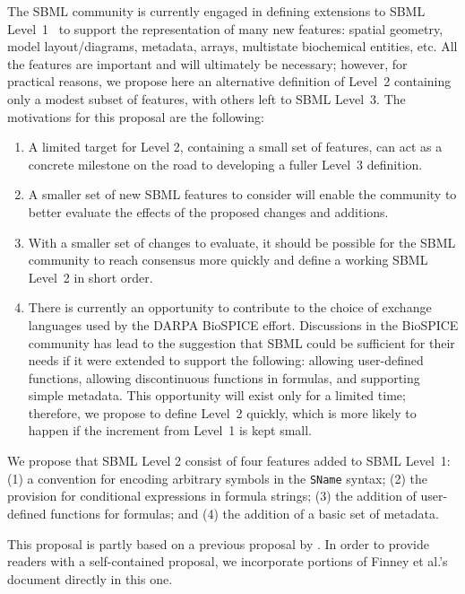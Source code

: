 \documentclass[10pt]{cekarticle}
\begin{document}
The SBML community is currently engaged in defining extensions to SBML
Level~1~\citep{hucka:2001g} to support the representation of many new
features: spatial geometry, model layout/diagrams, metadata, arrays,
multistate biochemical entities, etc.  All the features are important and
will ultimately be necessary; however, for practical reasons, we propose
here an alternative definition of Level~2 containing only a modest subset
of features, with others left to SBML Level~3.  The motivations for this
proposal are the following:
\begin{enumerate}
  
\item A limited target for Level 2, containing a small set of features, can
  act as a concrete milestone on the road to developing a fuller Level~3
  definition.
  
\item A smaller set of new SBML features to consider will enable the
  community to better evaluate the effects of the proposed changes and
  additions.

\item With a smaller set of changes to evaluate, it should be possible for
  the SBML community to reach consensus more quickly and define a working
  SBML Level~2 in short order.
  
\item There is currently an opportunity to contribute to the choice of
  exchange languages used by the DARPA BioSPICE effort.  Discussions in the
  BioSPICE community has lead to the suggestion that SBML could be
  sufficient for their needs if it were extended to support the following:
  allowing user-defined functions, allowing discontinuous functions in
  formulas, and supporting simple metadata.  This opportunity will exist
  only for a limited time; therefore, we propose to define Level~2 quickly,
  which is more likely to happen if the increment from Level~1 is kept
  small.

\end{enumerate}

We propose that SBML Level 2 consist of four features added to SBML
Level~1: (1) a convention for encoding arbitrary symbols in the
\texttt{SName} syntax; (2) the provision for conditional expressions in
formula strings; (3) the addition of user-defined functions for formulas;
and (4) the addition of a basic set of metadata.

This proposal is partly based on a previous proposal by
\citet{finney:2002c}.  In order to provide readers with a self-contained
proposal, we incorporate portions of Finney et al.'s document directly in
this one.
\end{document}
